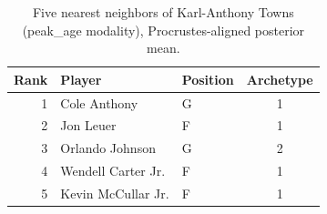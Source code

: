 \begin{table}[htbp]
  \centering\small
  \begin{tabular}{rllc}
    \toprule
    Rank & Player & Position & Archetype \\
    \midrule
    1 & Cole Anthony & G & 1 \\
    2 & Jon Leuer & F & 1 \\
    3 & Orlando Johnson & G & 2 \\
    4 & Wendell Carter Jr. & F & 1 \\
    5 & Kevin McCullar Jr. & F & 1 \\
    \bottomrule
  \end{tabular}
  \caption{Five nearest neighbors of Karl-Anthony Towns (peak_age modality), Procrustes-aligned posterior mean.}
  \label{tab:Karl_Anthony_Towns_neighbors_peak_age}
\end{table}

